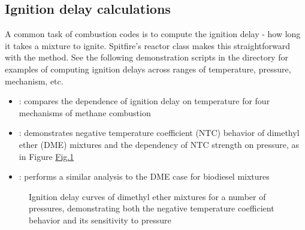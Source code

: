 \documentclass[letterpaper,10pt,english]{sphinxmanual}
\let\sphinxpxdimen\pdfpxdimen\else\newdimen\sphinxpxdimen
\begin{document}
\subsection{Ignition delay calculations}
\label{\detokenize{combustion:ignition-delay-calculations}}
A common task of combustion codes is to compute the ignition delay - how long it takes a mixture to ignite.
Spitfire’s reactor class makes this straightforward with the  method.
See the following demonstration scripts in the  directory for examples of computing ignition delays across ranges of temperature, pressure, mechanism, etc.
\begin{itemize}
\item {} 
: compares the dependence of ignition delay on temperature for four mechanisms of methane combustion

\item {} 
: demonstrates negative temperature coefficient (NTC) behavior of dimethyl ether (DME) mixtures and the dependency of NTC strength on pressure, as in Figure \hyperref[\detokenize{combustion:figure-dme-ntc-curves}]{Fig.\@ \ref{\detokenize{combustion:figure-dme-ntc-curves}}}

\item {} 
: performs a similar analysis to the DME case for biodiesel mixtures

\end{itemize}

\begin{figure}[htbp]
\centering
\capstart

\noindent\sphinxincludegraphics[width=640\sphinxpxdimen,height=480\sphinxpxdimen]{{dme_ntc_curves}.png}
\caption{Ignition delay curves of dimethyl ether mixtures for a number of pressures, demonstrating both the negative temperature coefficient behavior and its sensitivity to pressure}\label{\detokenize{combustion:id8}}\label{\detokenize{combustion:figure-dme-ntc-curves}}\end{figure}
\end{document}
